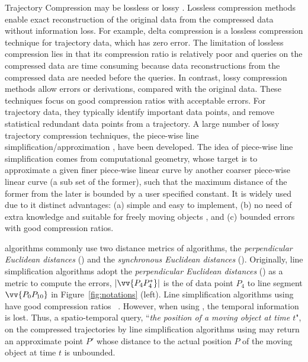 Trajectory Compression may be lossless or lossy \cite{Muckell:Compression}.
%
Lossless compression methods enable exact reconstruction of the original data from the compressed data without information loss. For example, delta compression \cite{Nibali:Trajic} is a lossless compression technique for trajectory data, which has zero error.
The limitation of lossless compression lies in that its compression ratio is relatively poor \cite{Nibali:Trajic} and {queries on the compressed data are time consuming because data reconstructions from the compressed data are needed before the queries}.
%
In contrast, lossy compression methods allow errors or derivations, compared with the original data.
These techniques focus on good compression ratios with acceptable errors. For trajectory data, they typically identify important data points, and remove statistical redundant data points from a trajectory.
A large number of lossy trajectory compression techniques, \eg the piece-wise line {simplification/approximation} \cite{Douglas:Peucker, Hershberger:Speeding, Keogh:online,Liu:BQS, Muckell:Compression, Chen:Trajectory, Chen:Fast, Cao:Spatio, Shi:Survey}, have been developed.
The idea of piece-wise line simplification comes from computational geometry, whose target is to approximate a given finer piece-wise linear curve by another coarser piece-wise linear curve (a sub set of the former), such that the maximum distance of the former from the later is bounded by a user specified constant. 
It is widely used due to it distinct advantages: (a) simple and easy to implement, (b) no need of extra knowledge and suitable for freely  moving  objects \cite{Popa:Spatio}, and (c) bounded errors with good compression ratios.

\lsa algorithms commonly use two distance metrics of \lsa algorithms, \ie the \emph{perpendicular Euclidean distances} (\ped) and the \emph{synchronous Euclidean distances} (\sed).
Originally, line simplification algorithms adopt the \emph{perpendicular Euclidean distances} (\ped) as a metric to compute the errors,
\eg $|\vv{P_4P^*_4}|$ is the \ped of data point $P_4$ to line segment $\vv{P_0P_{10}}$ in Figure~\ref{fig:notations} (left).
Line simplification algorithms using \ped have good compression ratios~ \cite{Douglas:Peucker, Hershberger:Speeding, Liu:BQS, Muckell:Compression, Chen:Trajectory, Cao:Spatio, Shi:Survey}.  However, when using \ped, the temporal information is lost. Thus, a spatio-temporal query, \eg ``\emph{the position of a moving object at time $t$}", on the compressed trajectories by line simplification algorithms using \ped may return an approximate point $P'$ whose distance to the actual position $P$ of the moving object at time $t$ is unbounded. %



